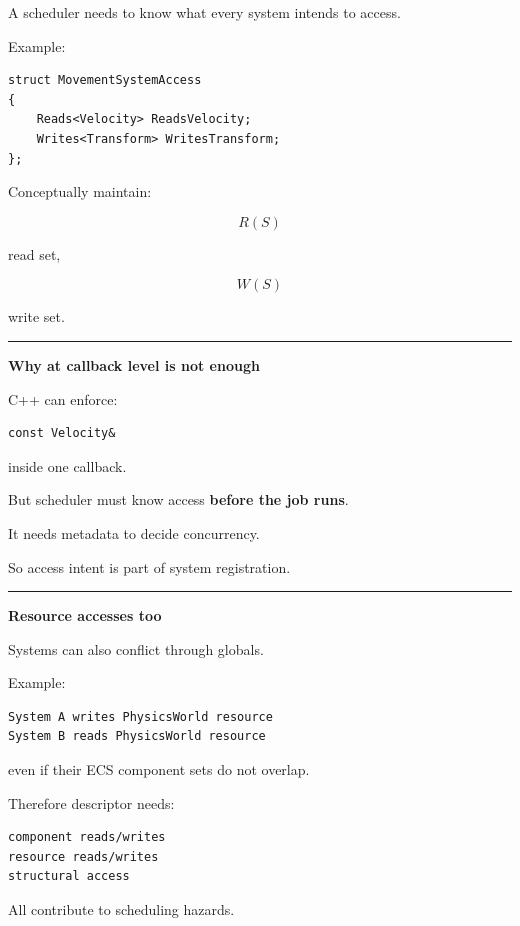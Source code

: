 A scheduler needs to know what every system intends to access.

Example:

\begin{verbatim}
struct MovementSystemAccess
{
    Reads<Velocity> ReadsVelocity;
    Writes<Transform> WritesTransform;
};
\end{verbatim}

Conceptually maintain:

\[
R(S)
\]

read set,

\[
W(S)
\]

write set.

\begin{center}\rule{0.5\linewidth}{0.5pt}\end{center}

\textbf{Why  at callback level is not enough}

C++ can enforce:

\begin{verbatim}
const Velocity&
\end{verbatim}

inside one callback.

But scheduler must know access \textbf{before the job runs}.

It needs metadata to decide concurrency.

So access intent is part of system registration.

\begin{center}\rule{0.5\linewidth}{0.5pt}\end{center}

\textbf{Resource accesses too}

Systems can also conflict through globals.

Example:

\begin{verbatim}
System A writes PhysicsWorld resource
System B reads PhysicsWorld resource
\end{verbatim}

even if their ECS component sets do not overlap.

Therefore descriptor needs:

\begin{verbatim}
component reads/writes
resource reads/writes
structural access
\end{verbatim}

All contribute to scheduling hazards.

